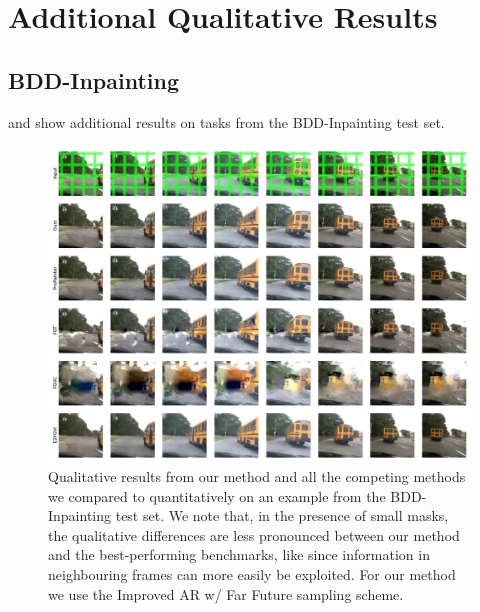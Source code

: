 \chapter{Additional Qualitative Results}
\section{BDD-Inpainting}
 and  show additional results on tasks from the BDD-Inpainting test set. 
\begin{figure}[h]
\begin{center}
    \centering
    \captionsetup{type=figure}
    \includegraphics[width=\linewidth]{figures/additional-samples/bus_all.pdf}
    \caption{Qualitative results from our method and all the competing methods we compared to quantitatively on an example from the BDD-Inpainting test set. We note that, in the presence of small masks, the qualitative differences are less pronounced between our method and the best-performing benchmarks, like since information in neighbouring frames can more easily be exploited. For our method we use the Improved AR w/ Far Future sampling scheme.}
    \label{fig:bus}
\end{center}
\end{figure}



